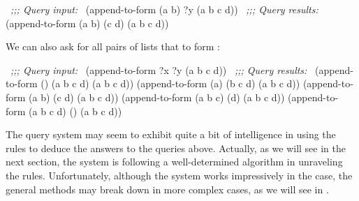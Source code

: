 \begin{codeBlock}
~\textit{;;; Query input:}~
(append-to-form (a b) ?y (a b c d))
~\textit{;;; Query results:}~
(append-to-form (a b) (c d) (a b c d))
\end{codeBlock}

\noindent
We can also ask for all pairs of lists that  to form :

\begin{codeBlock}
~\textit{;;; Query input:}~
(append-to-form ?x ?y (a b c d))
~\textit{;;; Query results:}~
(append-to-form () (a b c d) (a b c d))
(append-to-form (a) (b c d) (a b c d))
(append-to-form (a b) (c d) (a b c d))
(append-to-form (a b c) (d) (a b c d))
(append-to-form (a b c d) () (a b c d))
\end{codeBlock}

\noindent
The query system may seem to exhibit quite a bit of intelligence in using the
rules to deduce the answers to the queries above.  Actually, as we will see in
the next section, the system is following a well-determined algorithm in
unraveling the rules.  Unfortunately, although the system works impressively in
the  case, the general methods may break down in more complex
cases, as we will see in .

